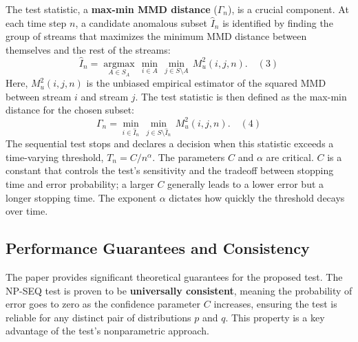 The test statistic, a \textbf{max-min MMD distance} ($\Gamma_n$), is a crucial component. At each time step $n$, a candidate anomalous subset $\hat{I}_n$ is identified by finding the group of streams that maximizes the minimum MMD distance between themselves and the rest of the streams:
\[
\hat{I}_n = \underset{A \in S_A}{\operatorname{argmax}} \, \underset{i \in A}{\operatorname{min}} \, \underset{j \in S \setminus A}{\operatorname{min}} \, M_u^2(i,j,n). \quad (3)
\]
Here, $M_u^2(i,j,n)$ is the unbiased empirical estimator of the squared MMD between stream $i$ and stream $j$. The test statistic is then defined as the max-min distance for the chosen subset:
\[
\Gamma_n = \underset{i \in \hat{I}_n}{\operatorname{min}} \, \underset{j \in S \setminus \hat{I}_n}{\operatorname{min}} \, M_u^2(i,j,n). \quad (4)
\]
The sequential test stops and declares a decision when this statistic exceeds a time-varying threshold, $T_n = C/n^{\alpha}$. The parameters \textbf{$C$} and \textbf{$\alpha$} are critical. $C$ is a constant that controls the test's sensitivity and the tradeoff between stopping time and error probability; a larger $C$ generally leads to a lower error but a longer stopping time. The exponent \textbf{$\alpha$} dictates how quickly the threshold decays over time.

\subsection{Performance Guarantees and Consistency}
The paper provides significant theoretical guarantees for the proposed test. The NP-SEQ test is proven to be \textbf{universally consistent}, meaning the probability of error goes to zero as the confidence parameter $C$ increases, ensuring the test is reliable for any distinct pair of distributions $p$ and $q$. This property is a key advantage of the test's nonparametric approach.


